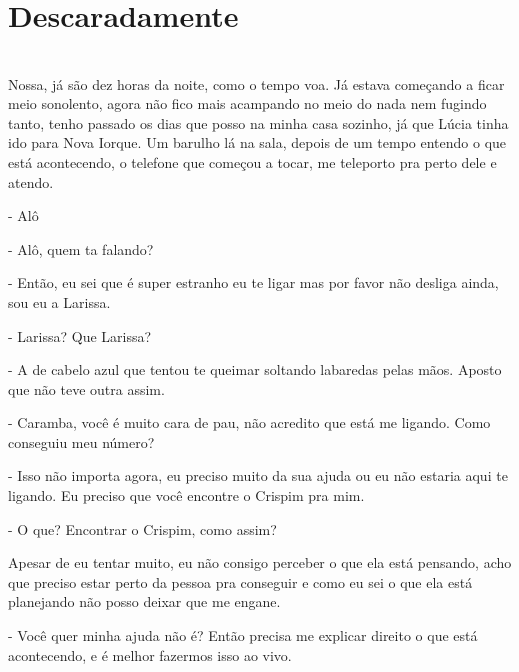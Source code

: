 
    



\newpage


\ifdefined\useChapters
\chapter{Descaradamente}

\else
\chapter{}
\fi


Nossa, já são dez horas da noite, como o tempo voa. Já estava começando a ficar meio sonolento, agora não fico mais acampando no meio do nada nem fugindo tanto, tenho passado os dias que posso na minha casa sozinho, já que Lúcia tinha ido para Nova Iorque. Um barulho lá na sala, depois de um tempo entendo o que está acontecendo, o telefone que começou a tocar, me teleporto pra perto dele e atendo.

- Alô

- Alô, quem ta falando?

- Então, eu sei que é super estranho eu te ligar mas por favor não desliga ainda, sou eu a Larissa.

- Larissa? Que Larissa?

- A de cabelo azul que tentou te queimar soltando labaredas pelas mãos. Aposto que não teve outra assim.

- Caramba, você é muito cara de pau, não acredito que está me ligando. Como conseguiu meu número?

- Isso não importa agora, eu preciso muito da sua ajuda ou eu não estaria aqui te ligando. Eu preciso que você encontre o Crispim pra mim.

- O que? Encontrar o Crispim, como assim?

Apesar de eu tentar muito, eu não consigo perceber o que ela está pensando, acho que preciso estar perto da pessoa pra conseguir e como eu sei o que ela está planejando não posso deixar que me engane.

- Você quer minha ajuda não é? Então precisa me explicar direito o que está acontecendo, e é melhor fazermos isso ao vivo.

